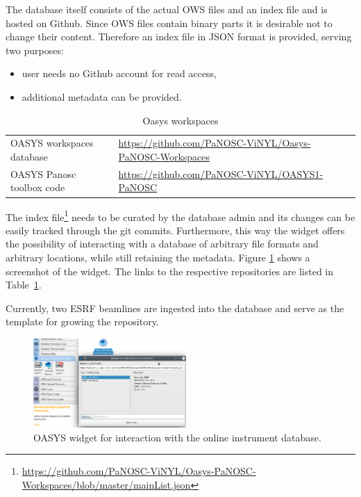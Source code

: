 \documentclass[11pt, a4paper]{article}
\begin{document}
The database itself consists of the actual OWS files and an index file and is hosted on Github. Since OWS files contain binary parts it is desirable not to change their content. Therefore an index file in JSON format is provided, serving two purposes:
\begin{itemize}
    \item user needs no Github account for read access,
    \item additional metadata can be provided.
\end{itemize}

\begin{table}[ht]
  \centering
  \caption{Oasys workspaces}
  \label{tab:oasys_workspaces}
  \begin{center}
    \begin{tabular}{ll}
      \hline
      OASYS workspaces database & \url{https://github.com/PaNOSC-ViNYL/Oasys-PaNOSC-Workspaces} \\
      OASYS Panosc toolbox code & \url{https://github.com/PaNOSC-ViNYL/OASYS1-PaNOSC} \\
      \hline
    \end{tabular}
  \end{center}
\end{table}


The index
file\footnote{\url{https://github.com/PaNOSC-ViNYL/Oasys-PaNOSC-Workspaces/blob/master/mainList.json}}
needs to be curated by the database admin and its changes can be easily tracked
through the git commits. Furthermore, this way the widget offers the possibility
of interacting with a database of arbitrary file formats and arbitrary
locations, while still retaining the metadata. Figure \ref{fig:oasys_database}
shows a screenshot of the widget. The links to the respective repositories are
listed in Table~\ref{tab:oasys_workspaces}.

Currently, two ESRF beamlines are ingested into the database and serve as the template for growing the repository.

\begin{figure}[ht]
    \centering
    \includegraphics[width=0.52\textwidth]{figures/oasys_database_widget.png}
    \caption{OASYS widget for interaction with the online instrument database.}
    \label{fig:oasys_database}
\end{figure}
\end{document}
